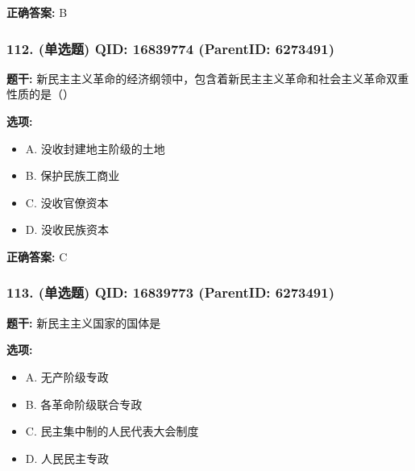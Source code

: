 \documentclass[12pt,UTF8]{ctexart}
\begin{document}
\textbf{正确答案:}
B

\vspace{0.3em}\hrulefill\vspace{0.7em}

\subsubsection*{112. (单选题) \small QID: 16839774 (ParentID: 6273491)}

\textbf{题干:}
新民主主义革命的经济纲领中，包含着新民主主义革命和社会主义革命双重性质的是（）



\textbf{选项:}
\begin{itemize}[leftmargin=*]

  \item A. 没收封建地主阶级的土地

  \item B. 保护民族工商业

  \item C. 没收官僚资本

  \item D. 没收民族资本

\end{itemize}

\textbf{正确答案:}
C

\vspace{0.3em}\hrulefill\vspace{0.7em}

\subsubsection*{113. (单选题) \small QID: 16839773 (ParentID: 6273491)}

\textbf{题干:}
新民主主义国家的国体是



\textbf{选项:}
\begin{itemize}[leftmargin=*]

  \item A. 无产阶级专政

  \item B. 各革命阶级联合专政

  \item C. 民主集中制的人民代表大会制度

  \item D. 人民民主专政

\end{itemize}
\end{document}
